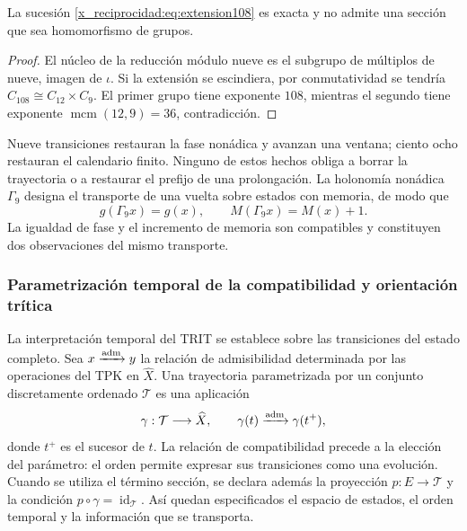 \begin{proposition}
La sucesión \eqref{x_reciprocidad:eq:extension108} es exacta y no admite una sección que sea homomorfismo de grupos.
\end{proposition}
\begin{proof}
El núcleo de la reducción módulo nueve es el subgrupo de múltiplos de nueve, imagen de \(\iota\). Si la extensión se escindiera, por conmutatividad se tendría \(C_{108}\cong C_{12}\times C_9\). El primer grupo tiene exponente \(108\), mientras el segundo tiene exponente \(\operatorname{mcm}(12,9)=36\), contradicción.
\end{proof}

Nueve transiciones restauran la fase nonádica y avanzan una ventana; ciento ocho restauran el calendario finito. Ninguno de estos hechos obliga a borrar la trayectoria o a restaurar el prefijo de una prolongación. La holonomía nonádica \(\Gamma_9\) designa el transporte de una vuelta sobre estados con memoria, de modo que
\begin{equation}
 g(\Gamma_9x)=g(x),\qquad M(\Gamma_9x)=M(x)+1.
 \label{x_reciprocidad:eq:holonomia-memoria}
\end{equation}
La igualdad de fase y el incremento de memoria son compatibles y constituyen dos observaciones del mismo transporte.


\subsubsection{Parametrización temporal de la compatibilidad y orientación trítica}
\label{x_reciprocidad:trit-temporal-compatibilidad}

La interpretación temporal del TRIT se establece sobre las transiciones del
estado completo. Sea \(x\xrightarrow{\rm adm}y\) la relación de admisibilidad determinada
por las operaciones del TPK en \(\widehat X\). Una trayectoria parametrizada
por un conjunto discretamente ordenado \(\mathcal T\) es una aplicación
\[
 \gamma:\mathcal T\longrightarrow\widehat X,\qquad
 \gamma(t)\xrightarrow{\rm adm}\gamma(t^+),
\]
donde \(t^+\) es el sucesor de \(t\). La relación de compatibilidad precede a
la elección del parámetro: el orden permite expresar sus transiciones como
una evolución. Cuando se utiliza el término sección, se declara además la
proyección \(p:E\to\mathcal T\) y la condición
\(p\circ\gamma=\operatorname{id}_{\mathcal T}\). Así quedan especificados
el espacio de estados, el orden temporal y la información que se transporta.


